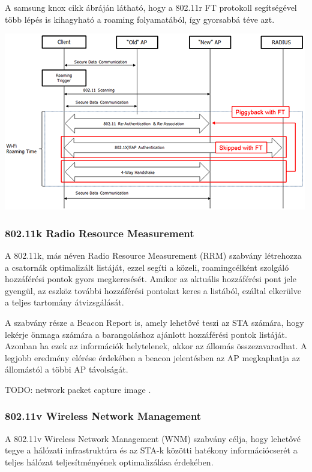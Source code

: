\documentclass[12pt]{article}
\begin{document}
A samsung knox cikk ábráján látható, hogy a 802.11r FT protokoll segítségével több lépés is kihagyható a roaming folyamatából, így gyorsabbá téve azt.

\includegraphics[scale=1.08]{80211r.png}

\subsubsection{802.11k Radio Resource Measurement}

A 802.11k, más néven Radio Resource Measurement (RRM) szabvány létrehozza a csatornák optimalizált listáját, ezzel segíti a közeli, roamingcélként szolgáló hozzáférési pontok gyors megkeresését. Amikor az aktuális hozzáférési pont jele gyengül, az eszköz további hozzáférési pontokat keres a listából, ezáltal elkerülve a teljes tartomány átvizsgálását.


A szabvány része a Beacon Report is, amely lehetővé teszi az STA számára, hogy lekérje önmaga számára a barangoláshoz ajánlott hozzáférési pontok listáját. Azonban ha ezek az információk helytelenek, akkor az állomás összezavarodhat. A legjobb eredmény elérése érdekében a beacon jelentésben az AP megkaphatja az állomástól a többi AP távolságát.

TODO: network packet capture image
. %



\subsubsection{802.11v Wireless Network Management}

A 802.11v Wireless Network Management (WNM) szabvány célja, hogy lehetővé tegye a hálózati infrastruktúra és az STA-k közötti hatékony információcserét a teljes hálózat teljesítményének optimalizálása érdekében.
\end{document}
